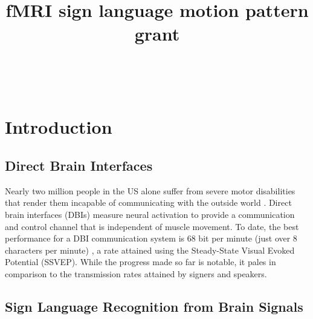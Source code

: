 \documentclass{proposal}
\title{fMRI sign language motion pattern grant}
\begin{document}
\maketitle

\\

\section{Introduction}

\subsection{Direct Brain Interfaces}

Nearly two million people in the US alone suffer from severe motor disabilities that render them incapable of communicating with the outside world \cite[]{ficke1992ddp, NABMRR1992, murray1997gmd, carter1997rmn}. Direct brain interfaces (DBIs) measure neural activation to provide a communication and control channel that is independent of muscle movement. To date, the best performance for a DBI communication system is 68 bit per minute (just over 8 characters per minute) \cite[]{gao2003bbe}, a rate attained using the Steady-State Visual Evoked Potential (SSVEP). While the progress made so far is notable, it pales in comparison to the transmission rates attained by signers and speakers.

\subsection{Sign Language Recognition from Brain Signals}
\end{document}
